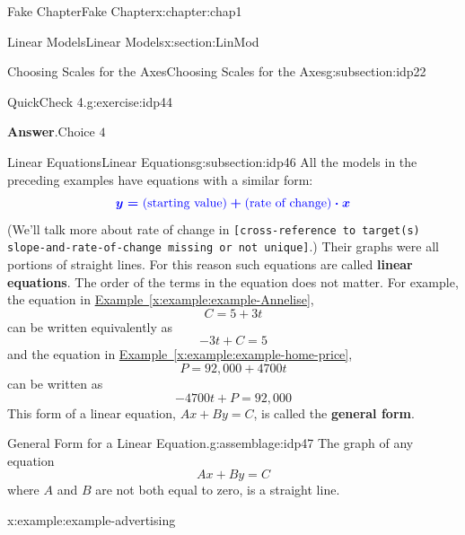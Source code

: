 \documentclass[oneside,10pt,]{book}
\newcommand{\blocktitlefont}{\relax}
\newcommand{\xreffont}{\relax}
\newcommand{\mono}[1]{\texttt{#1}}
\newcommand{\terminology}[1]{\textbf{#1}}
\numberwithin{equation}{section}
\newcommand{\blert}[1]{\boldsymbol{\color{blue}{#1}}}
\begin{document}
\begin{chapterptx}{Fake Chapter}{}{Fake Chapter}{}{}{x:chapter:chap1}
\begin{sectionptx}{Linear Models}{}{Linear Models}{}{}{x:section:LinMod}
\begin{subsectionptx}{Choosing Scales for the Axes}{}{Choosing Scales for the Axes}{}{}{g:subsection:idp22}
\begin{inlineexercise}{QuickCheck 4.}{g:exercise:idp44}
\begin{itemize}[label=$\odot$,leftmargin=3em,]
\end{itemize}
%
\par\smallskip%
\noindent\textbf{\blocktitlefont Answer}.\hypertarget{g:answer:idp45}{}\quad{}\(\text{Choice 4}\)%
\end{inlineexercise}%
\end{subsectionptx}
%
%
\typeout{************************************************}
\typeout{************************************************}
%
\begin{subsectionptx}{Linear Equations}{}{Linear Equations}{}{}{g:subsection:idp46}
All the models in the preceding examples have equations with a similar form:%
\begin{equation*}
\blert{y=\text{(starting value)}+\text{(rate of change)}\cdot x}
\end{equation*}
(We'll talk more about rate of change in \mono{[cross-reference to target(s) \textquotedbl{}slope-and-rate-of-change\textquotedbl{} missing or not unique]}.)  Their graphs were all portions of straight lines.  For this reason such equations are called  \terminology{linear equations}.  The order of the terms in the equation does not matter.  For example, the equation in \hyperref[x:example:example-Annelise]{Example~{\xreffont\ref{x:example:example-Annelise}}},%
\begin{equation*}
C=5+3t
\end{equation*}
can be written equivalently as%
\begin{equation*}
-3t+C=5
\end{equation*}
and the equation in \hyperref[x:example:example-home-price]{Example~{\xreffont\ref{x:example:example-home-price}}},%
\begin{equation*}
P=92,000+4700t
\end{equation*}
can be written as%
\begin{equation*}
-4700t +P=92,000
\end{equation*}
This form of a linear equation, \(Ax+By=C \), is called the \terminology{general form}.%
\begin{assemblage}{General Form for a Linear Equation.}{g:assemblage:idp47}%
The graph of any equation%
\begin{equation*}
Ax+By=C
\end{equation*}
where \(A\) and \(B\) are not both equal to zero, is a straight line.%
\end{assemblage}
\begin{example}{}{x:example:example-advertising}%

\end{example}
\end{subsectionptx}
\end{sectionptx}
\end{chapterptx}
\end{document}
